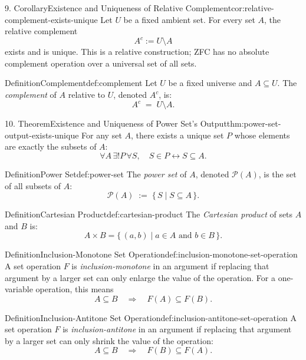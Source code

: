 \documentclass[11pt]{article}
\begin{document}
\begin{studyblock}{9. Corollary}{Existence and Uniqueness of Relative Complement}{cor:relative-complement-exists-unique}
Let $U$ be a fixed ambient set. For every set $A$, the relative complement
\[
  A^c:=U\setminus A
\]
exists and is unique. This is a relative construction; ZFC has no absolute
complement operation over a universal set of all sets.
\end{studyblock}
\begin{studyblock}{Definition}{Complement}{def:complement}
Let $U$ be a fixed universe and $A \subseteq U$. The \emph{complement} of $A$
relative to $U$, denoted $A^c$, is:
\[
A^c \;=\; U \setminus A.
\]
\end{studyblock}
\begin{studyblock}{10. Theorem}{Existence and Uniqueness of Power Set's Output}{thm:power-set-output-exists-unique}
For any set $A$, there exists a unique set $P$ whose elements are exactly the
subsets of $A$:
\[
  \forall A\,\exists! P\,\forall S,\quad
  S\in P\leftrightarrow S\subseteq A.
\]
\end{studyblock}
\begin{studyblock}{Definition}{Power Set}{def:power-set}
The \emph{power set} of $A$, denoted $\mathcal{P}(A)$, is the set of all
subsets of $A$:
\[
\mathcal{P}(A) \;:=\; \{\, S \mid S \subseteq A \,\}.
\]
\end{studyblock}
\begin{studyblock}{Definition}{Cartesian Product}{def:cartesian-product}
The \emph{Cartesian product} of sets $A$ and $B$ is:
\[
A \times B = \{\, (a,b) \mid a \in A \text{ and } b \in B \,\}.
\]
\end{studyblock}
\begin{studyblock}{Definition}{Inclusion-Monotone Set Operation}{def:inclusion-monotone-set-operation}
A set operation $F$ is \emph{inclusion-monotone} in an argument if replacing
that argument by a larger set can only enlarge the value of the operation.
For a one-variable operation, this means
\[
A\subseteq B \quad\Longrightarrow\quad F(A)\subseteq F(B).
\]
\end{studyblock}
\begin{studyblock}{Definition}{Inclusion-Antitone Set Operation}{def:inclusion-antitone-set-operation}
A set operation $F$ is \emph{inclusion-antitone} in an argument if replacing
that argument by a larger set can only shrink the value of the operation:
\[
A\subseteq B \quad\Longrightarrow\quad F(B)\subseteq F(A).
\]
\end{studyblock}
\end{document}
